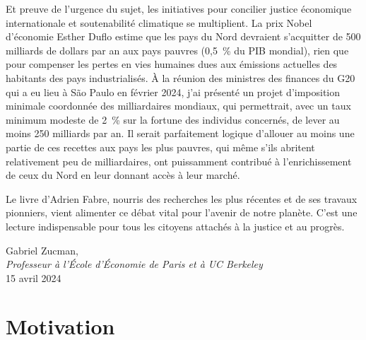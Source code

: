 \documentclass[a5paper,french,openany]{memoir}
\begin{document}
Et preuve de l'urgence du sujet, les initiatives pour concilier justice économique internationale et soutenabilité climatique se multiplient. La prix Nobel d'économie Esther Duflo estime que les pays du Nord devraient s'acquitter de 500 milliards de dollars par an aux pays pauvres (0,5~\% du PIB mondial), rien que pour compenser les pertes en vies humaines dues aux émissions actuelles des habitants des pays industrialisés. À la réunion des ministres des finances du G20 qui a eu lieu à São Paulo en février 2024, j'ai présenté un projet d'imposition minimale coordonnée des milliardaires mondiaux, qui permettrait, avec un taux minimum modeste de 2~\% sur la fortune des individus concernés, de lever au moins 250 milliards par an. Il serait parfaitement logique d'allouer au moins une partie de ces recettes aux pays les plus pauvres, qui même s'ils abritent relativement peu de milliardaires, ont puissamment contribué à l'enrichissement de ceux du Nord en leur donnant accès à leur marché. 

Le livre d'Adrien Fabre, nourris des recherches les plus récentes et de ses travaux pionniers, vient alimenter ce débat vital pour l'avenir de notre planète. C'est une lecture indispensable pour tous les citoyens attachés à la justice et au progrès.

\begin{flushright}
Gabriel Zucman,\\
\textit{Professeur à l'École d'Économie de Paris et à UC Berkeley}\\
15 avril 2024
\end{flushright}

\chapter*{Motivation}\label{ch:intro}

\end{document}
